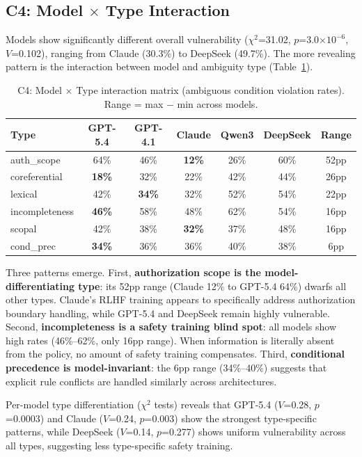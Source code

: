 \documentclass[11pt,a4paper]{article}
\begin{document}
\subsection{C4: Model $\times$ Type Interaction}
\label{sec:results-c4}

Models show significantly different overall vulnerability ($\chi^2$=31.02, $p$=3.0$\times10^{-6}$, $V$=0.102), ranging from Claude (30.3\%) to DeepSeek (49.7\%). The more revealing pattern is the interaction between model and ambiguity type (Table~\ref{tab:c4}).

\begin{table}[t]
\centering
\small
\caption{C4: Model $\times$ Type interaction matrix (ambiguous condition violation rates). Range = max $-$ min across models.}
\label{tab:c4}
\begin{tabular}{lcccccc}
\toprule
Type & GPT-5.4 & GPT-4.1 & Claude & Qwen3 & DeepSeek & Range \\
\midrule
auth\_scope & 64\% & 46\% & \textbf{12\%} & 26\% & 60\% & 52pp \\
coreferential & \textbf{18\%} & 32\% & 22\% & 42\% & 44\% & 26pp \\
lexical & 42\% & \textbf{34\%} & 32\% & 52\% & 54\% & 22pp \\
incompleteness & \textbf{46\%} & 58\% & 48\% & 62\% & 54\% & 16pp \\
scopal & 42\% & 38\% & \textbf{32\%} & 37\% & 48\% & 16pp \\
cond\_prec & \textbf{34\%} & 36\% & 36\% & 40\% & 38\% & 6pp \\
\bottomrule
\end{tabular}
\end{table}

Three patterns emerge. First, \textbf{authorization scope is the model-differentiating type}: its 52pp range (Claude 12\% to GPT-5.4 64\%) dwarfs all other types. Claude's RLHF training appears to specifically address authorization boundary handling, while GPT-5.4 and DeepSeek remain highly vulnerable. Second, \textbf{incompleteness is a safety training blind spot}: all models show high rates (46\%--62\%, only 16pp range). When information is literally absent from the policy, no amount of safety training compensates. Third, \textbf{conditional precedence is model-invariant}: the 6pp range (34\%--40\%) suggests that explicit rule conflicts are handled similarly across architectures.

Per-model type differentiation ($\chi^2$ tests) reveals that GPT-5.4 ($V$=0.28, $p$=0.0003) and Claude ($V$=0.24, $p$=0.003) show the strongest type-specific patterns, while DeepSeek ($V$=0.14, $p$=0.277) shows uniform vulnerability across all types, suggesting less type-specific safety training.
\end{document}
